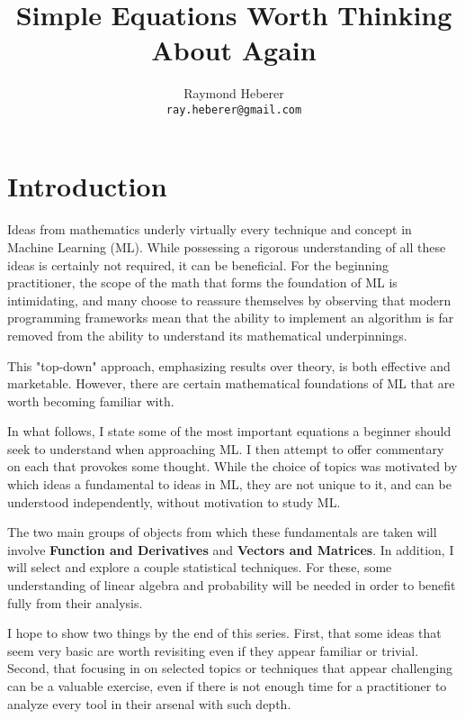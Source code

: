 \documentclass[a4paper]{article}
\title{Simple Equations Worth Thinking About Again}
\author{Raymond Heberer\\
  \texttt{ray.heberer@gmail.com}}
\begin{document}
\maketitle

\section{Introduction}

\paragraph{} Ideas from mathematics underly virtually every technique and concept in Machine Learning (ML). While possessing a rigorous understanding of all these ideas is certainly not required, it can be beneficial. For the beginning practitioner, the scope of the math that forms the foundation of ML is intimidating, and many choose to reassure themselves by observing that modern programming frameworks mean that the ability to implement an algorithm is far removed from the ability to understand its mathematical underpinnings. 

This "top-down" approach, emphasizing results over theory, is both effective and marketable. However, there are certain mathematical foundations of ML that are worth becoming familiar with.

In what follows, I state some of the most important equations a beginner should seek to understand when approaching ML. I then attempt to offer commentary on each that provokes some thought. While the choice of topics was motivated by which ideas a fundamental to ideas in ML, they are not unique to it, and can be understood independently, without motivation to study ML. 

The two main groups of objects from which these fundamentals are taken will involve \textbf{Function and Derivatives} and \textbf{Vectors and Matrices}. In addition, I will select and explore a couple statistical techniques. For these, some understanding of linear algebra and probability will be needed in order to benefit fully from their analysis.

I hope to show two things by the end of this series. First, that some ideas that seem very basic are worth revisiting even if they appear familiar or trivial. Second, that focusing in on selected topics or techniques that appear challenging can be a valuable exercise, even if there is not enough time for a practitioner to analyze every tool in their arsenal with such depth.
\end{document}
